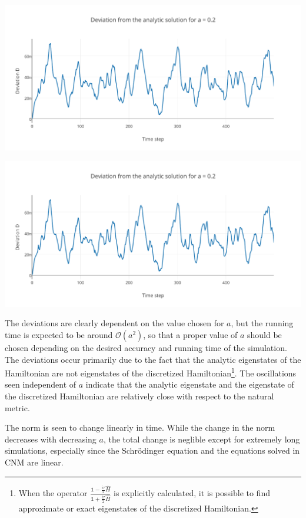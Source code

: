 \begin{Figure}
    \centering
    \includegraphics[width=\linewidth]{distancea10.pdf}
    \label{fig:distancea05}
\end{Figure}


\begin{Figure}
    \centering
    \includegraphics[width=\linewidth]{distancea10.pdf}
    \label{fig:distancea02}
\end{Figure}

The deviations are clearly dependent on the value chosen for $a$, but the running time is expected to be around $\mathcal{O}(a^2)$, so that a proper value of $a$ should be chosen depending on the desired accuracy and running time of the simulation. The deviations occur primarily due to the fact that the analytic eigenstates of the Hamiltonian are not eigenstates of the discretized Hamiltonian\footnote{When the operator $\frac{\mathbb{1}-\frac{i\tau}{2}\hat{H}}{\mathbb{1}+\frac{i\tau}{2}\hat{H}}$ is explicitly calculated, it is possible to find approximate or exact eigenstates of the discretized Hamiltonian.}. The oscillations seen independent of $a$ indicate that the analytic eigenstate and the eigenstate of the discretized Hamiltonian are relatively close with respect to the natural metric.


The norm is seen to change linearly in time. While the change in the norm decreases with decreasing $a$, the total change is neglible except for extremely long simulations, especially since the Schr\"{o}dinger equation and the equations solved in CNM are linear.
